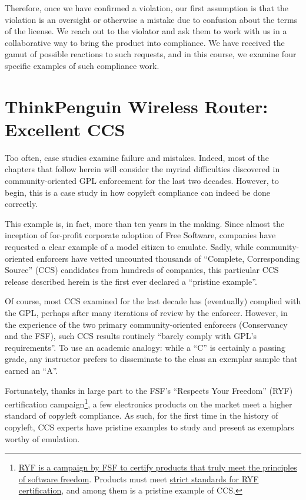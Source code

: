 Therefore, once we have confirmed a violation, our first assumption is
that the violation is an oversight or otherwise a mistake due to confusion
about the terms of the license. We reach out to the violator and ask them
to work with us in a collaborative way to bring the product into
compliance. We have received the gamut of possible reactions to such
requests, and in this course, we examine four specific examples of such
compliance work.

\chapter{ThinkPenguin Wireless Router: Excellent CCS}
\label{pristine-example}

Too often, case studies examine failure and mistakes.  Indeed, most of the
chapters that follow herein will consider the myriad difficulties discovered
in community-oriented GPL enforcement for the last two decades.  However, to
begin, this is a case study in how copyleft compliance can indeed be done correctly.

This example is, in fact, more than ten years in the making.  Since almost
the inception of for-profit corporate adoption of Free Software, companies
have requested a clear example of a model citizen to emulate.  Sadly, while
community-oriented enforcers have vetted uncounted thousands of ``Complete,
Corresponding Source'' (CCS) candidates from hundreds of companies, this
particular CCS release described herein is the first ever declared a ``pristine
example''.


Of course, most CCS examined for the last decade has (eventually) complied
with the GPL, perhaps after many iterations of review by the enforcer.
However, in the experience of the two primary community-oriented enforcers
(Conservancy and the FSF), such CCS results routinely 
``barely comply with GPL's requirements''.  To use an academic analogy:
while a ``C'' is certainly a passing grade, any instructor prefers to
disseminate to the class an exemplar sample that earned an ``A''.

Fortunately, thanks in large part to the FSF's
``Respects Your Freedom'' (RYF) certification campaign\footnote{\href{http://www.fsf.org/resources/hw/endorsement/respects-your-freedom}{RYF is
    a campaign by FSF to certify products that truly meet the principles of
    software freedom}.  Products must meet
  \href{http://www.fsf.org/resources/hw/endorsement/criteria}{strict
    standards for RYF certification}, and among them is a pristine example of
  CCS\@.}, a few electronics products on the market meet
a higher standard of copyleft compliance.  As such, for the first
time in the history of copyleft, CCS experts have pristine examples to study
and present as exemplars worthy of emulation.

